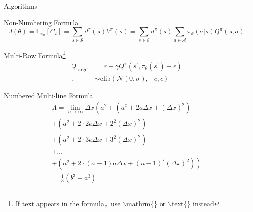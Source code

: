 \documentclass[serif, aspectratio=169]{beamer}
\begin{document}
\begin{frame}{Algorithms}
    \begin{exampleblock}{Non-Numbering Formula}
        \begin{equation*}
            J(\theta) = \mathbb{E}_{\pi_\theta}[G_t] = \sum_{s\in\mathcal{S}} d^\pi (s)V^\pi(s)=\sum_{s\in\mathcal{S}} d^\pi(s)\sum_{a\in\mathcal{A}}\pi_\theta(a|s)Q^\pi(s,a)
        \end{equation*}
    \end{exampleblock}
    \begin{exampleblock}{Multi-Row Formula\footnote{If text appears in the formula，use $\backslash$mathrm\{\} or $\backslash$text\{\} instead}}
        \begin{align}
            Q_\mathrm{target}&=r+\gamma Q^\pi(s^\prime, \pi_\theta(s^\prime)+\epsilon)\\
            \epsilon&\sim\mathrm{clip}(\mathcal{N}(0, \sigma), -c, c)\nonumber
        \end{align}
    \end{exampleblock}
\end{frame}

\begin{frame}
    \begin{exampleblock}{Numbered Multi-line Formula}
        \begin{multline}
            A=\lim_{n\rightarrow\infty}\Delta x\left(a^{2}+\left(a^{2}+2a\Delta x+\left(\Delta x\right)^{2}\right)\right.\label{eq:reset}\\
            +\left(a^{2}+2\cdot2a\Delta x+2^{2}\left(\Delta x\right)^{2}\right)\\
            +\left(a^{2}+2\cdot3a\Delta x+3^{2}\left(\Delta x\right)^{2}\right)\\
            +\ldots\\
            \left.+\left(a^{2}+2\cdot(n-1)a\Delta x+(n-1)^{2}\left(\Delta x\right)^{2}\right)\right)\\
            =\frac{1}{3}\left(b^{3}-a^{3}\right)
        \end{multline}
    \end{exampleblock}
\end{frame}
\end{document}
